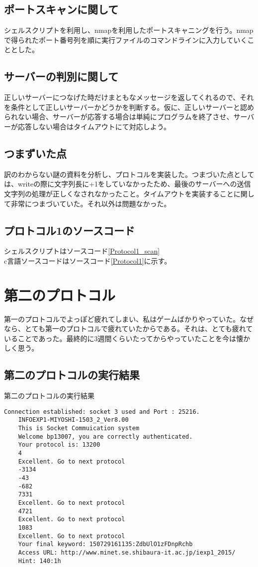 \documentclass[a4paper,12pt]{jarticle}
\begin{document}
  \subsection{ポートスキャンに関して}
シェルスクリプトを利用し、nmapを利用したポートスキャニングを行う。nmapで得られたポート番号列を順に実行ファイルのコマンドラインに入力していくこととした。
\subsection{サーバーの判別に関して}
正しいサーバーにつなげた時だけまともなメッセージを返してくれるので、それを条件として正しいサーバーかどうかを判断する。仮に、正しいサーバーと認められない場合、サーバーが応答する場合は単純にプログラムを終了させ、サーバーが応答しない場合はタイムアウトにて対応しよう。
\subsection{つまずいた点}
訳のわからない謎の資料を分析し、プロトコルを実装した。つまづいた点としては、writeの際に文字列長に+1をしていなかったため、最後のサーバーへの送信文字列の処理が正しくなされなかったこと。タイムアウトを実装することに関して非常につまづいていた。それ以外は問題なかった。
\subsection{プロトコル1のソースコード}
 シェルスクリプトはソースコード\ref{Protocol1_scan}\\
 c言語ソースコードはソースコード\ref{Protocol1}に示す。

 \section{第二のプロトコル}
 第一のプロトコルでよっぽど疲れてしまい、私はゲームばかりやっていた。なぜなら、とても第一のプロトコルで疲れていたからである。それは、とても疲れていることであった。最終的に3週間くらいたってからやっていたことを今は懐かしく思う。

  \subsection{第二のプロトコルの実行結果}
 \begin{itembox}{第二のプロトコルの実行結果}
  \begin{verbatim}
Connection established: socket 3 used and Port : 25216.
	INFOEXP1-MIYOSHI-1503_2_Ver8.00
	This is Socket Commuication system
	Welcome bp13007, you are correctly authenticated.
	Your protocol is: 13200
	4
	Excellent. Go to next protocol
	-3134
	-43
	-682
	7331
	Excellent. Go to next protocol
	4721
	Excellent. Go to next protocol
	1083
	Excellent. Go to next protocol
	Your final keyword: 150729161135:ZdbUlO1zFDnpRchb
	Access URL: http://www.minet.se.shibaura-it.ac.jp/iexp1_2015/
	Hint: 140:1h	
  \end{verbatim}
 \end{itembox}
 
\end{document}
